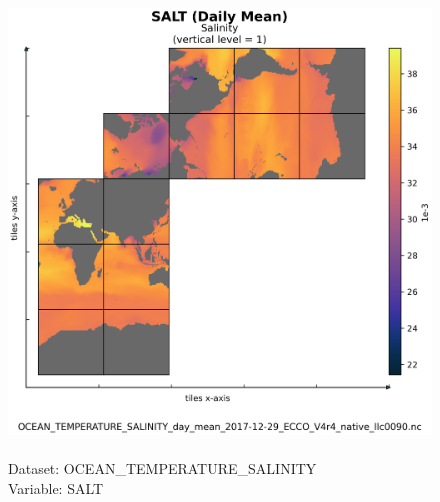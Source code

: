 \begin{figure}[H]
\centering
\includegraphics[scale=0.5]{../images/plots/native_plots/Ocean_Temperature_and_Salinity/SALT.png}
\caption{\\Dataset: OCEAN\_TEMPERATURE\_SALINITY\\Variable: SALT}
\label{tab:table-OCEAN_TEMPERATURE_SALINITY_SALT-Plot}
\end{figure}
\pagebreak
